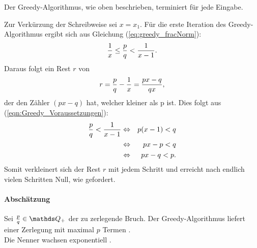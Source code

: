 \begin{satz}
	Der Greedy-Algorithmus, wie oben beschrieben, terminiert für jede Eingabe.
\end{satz}
\begin{bew}
	Zur Verkürzung der Schreibweise sei  $x = x_1$.
	Für die erste Iteration des Greedy-Algorithmus ergibt sich aus Gleichung (\ref{eq:greedy_fracNorm}):
	\begin{equation}\label{eqn:Greedy_Voraussetzungen}
		\frac{1}{x} \leq \frac{p}{q} < \frac{1}{x-1}.
	\end{equation}
	Daraus folgt ein Rest $r$ von
	$$ r = \frac{p}{q}-\frac{1}{x} = \frac{px-q}{qx},$$
	der den Zähler $(px-q)$ hat, welcher kleiner als p ist. Dies folgt aus (\ref{eqn:Greedy_Voraussetzungen}):
	\begin{eqnarray*}
		\frac{p}{q} < \frac{1}{x-1}& \Leftrightarrow & p(x-1)<q\\
		& \Leftrightarrow & px-p < q\\
		& \Leftrightarrow & px-q < p.\\
	\end{eqnarray*}
	Somit verkleinert sich der Rest $r$ mit jedem Schritt und erreicht nach endlich vielen Schritten Null, wie gefordert.
\end{bew}

\paragraph{Abschätzung} Sei $\frac{p}{q} \in \Q_+$ der zu zerlegende Bruch. Der Greedy-Algorithmus liefert einer Zerlegung mit maximal $p$ Termen \cite[S.7]{Gong1992}.\\
Die Nenner wachsen exponentiell \cite[S.157]{BleicherErdoes1976}.